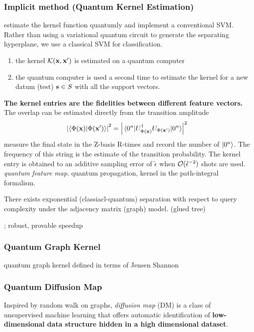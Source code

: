 \subsubsection{Implicit method (Quantum Kernel Estimation)}
estimate the kernel function quantumly and implement a conventional SVM.
Rather than using a variational quantum circuit to generate the separating hyperplane, we use a classical SVM for classification.
\begin{enumerate}
	\item the kernel $\mathcal{K}(\vb{x},\vb{x}')$ is estimated on a quantum computer
	\item the quantum computer is used a second time to estimate the kernel for a new datum (test) $\vb{s}\in S$ with all the support vectors.
\end{enumerate}

\textbf{The kernel entries are the fidelities between different feature vectors.}
The overlap can be estimated directly from the transition amplitude 
\begin{equation}
	\abs{\braket{\Phi(\vbx)}{\Phi(\vbx')}}^2 = 
	\abs{\matrixel{0^n}{U^\dagger_{\Phi(\vbx)} U_{\Phi(\vbx')}}{0^n}}^2
\end{equation}
measure the final state in the Z-basis R-times and record the number of $\ket{0^n}$.
The frequency of this string is the estimate of the transition probability.
The kernel entry is obtained to an additive sampling error of $\tilde{\epsilon}$ when $\mathcal{O}(\tilde{\epsilon}^{-2})$ shots are used.
\emph{quantum feature map}.
quantum propagation, kernel in the path-integral formalism.

\begin{theorem}
	There exists exponential (classiacl-quantum) separation with respect to query complexity under the adjacency matrix (graph) model. (glued tree)
\end{theorem}
\cite{zhengSpeedingLearningQuantum2022};
robust, provable speedup
\cite{liuRigorousRobustQuantum2021}

\subsubsection{Quantum Graph Kernel}
quantum graph kernel defined in terms of Jensen Shannon
\cite{baiQuantumJensenShannon2015}

\subsubsection{Quantum Diffusion Map}
Inspired by random walk on graphs, \emph{diffusion map} (DM) is a class of unsupervised machine learning that oﬀers automatic identification of \textbf{low-dimensional data structure hidden in a high dimensional dataset}.
\cite{sornsaengQuantumDiffusionMap2021}


